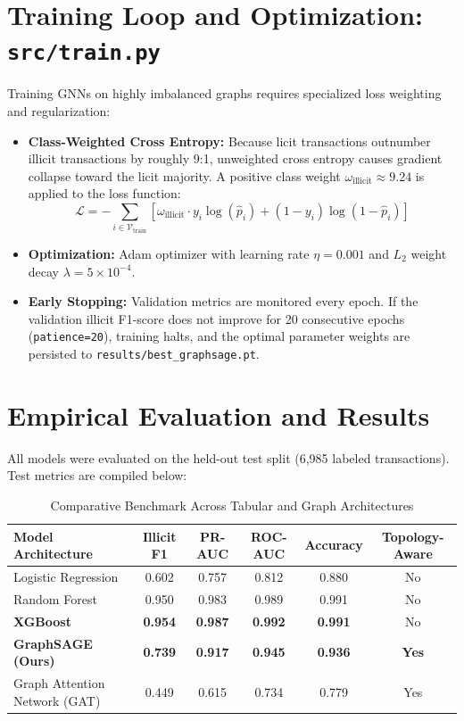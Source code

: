 \documentclass[11pt,a4paper]{report}
\begin{document}
\section{Training Loop and Optimization: \texttt{src/train.py}}
Training GNNs on highly imbalanced graphs requires specialized loss weighting and regularization:
\begin{itemize}[leftmargin=1.5em]
  \item \textbf{Class-Weighted Cross Entropy:} Because licit transactions outnumber illicit transactions by roughly 9:1, unweighted cross entropy causes gradient collapse toward the licit majority. A positive class weight $\omega_{\text{illicit}} \approx 9.24$ is applied to the loss function:
  \[
  \mathcal{L} = -\sum_{i \in \mathcal{V}_{\text{train}}} \left[ \omega_{\text{illicit}} \cdot y_i \log(\hat{p}_i) + (1 - y_i) \log(1 - \hat{p}_i) \right]
  \]
  \item \textbf{Optimization:} Adam optimizer with learning rate $\eta = 0.001$ and $L_2$ weight decay $\lambda = 5 \times 10^{-4}$.
  \item \textbf{Early Stopping:} Validation metrics are monitored every epoch. If the validation illicit F1-score does not improve for 20 consecutive epochs (\texttt{patience=20}), training halts, and the optimal parameter weights are persisted to \texttt{results/best\_graphsage.pt}.
\end{itemize}

\section{Empirical Evaluation and Results}
All models were evaluated on the held-out test split (6,985 labeled transactions). Test metrics are compiled below:

\begin{table}[h]
\centering
\begin{tabular}{lccccc}
\toprule
\textbf{Model Architecture} & \textbf{Illicit F1} & \textbf{PR-AUC} & \textbf{ROC-AUC} & \textbf{Accuracy} & \textbf{Topology-Aware} \\
\midrule
Logistic Regression & 0.602 & 0.757 & 0.812 & 0.880 & No \\
Random Forest & 0.950 & 0.983 & 0.989 & 0.991 & No \\
\textbf{XGBoost} & \textbf{0.954} & \textbf{0.987} & \textbf{0.992} & \textbf{0.991} & No \\
\textbf{GraphSAGE (Ours)} & \textbf{0.739} & \textbf{0.917} & \textbf{0.945} & \textbf{0.936} & \textbf{Yes} \\
Graph Attention Network (GAT) & 0.449 & 0.615 & 0.734 & 0.779 & Yes \\
\bottomrule
\end{tabular}
\caption{Comparative Benchmark Across Tabular and Graph Architectures}
\label{tab:results}
\end{table}
\end{document}
